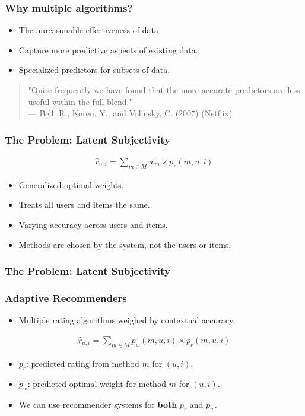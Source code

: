 \documentclass[screen]{beamer}
\begin{document}
\begin{frame}
  \frametitle{Why multiple algorithms?}
  \begin{itemize}
    \item The unreasonable effectiveness of data
    \item Capture more predictive aspects of existing data.
    \item Specialized predictors for subsets of data.
  \end{itemize}
  \vspace{2em}
  \begin{quote}
    "Quite frequently we have found that the more accurate predictors are less useful within the full blend."\\
    --- Bell, R., Koren, Y., and Volinsky, C. (2007) (Netflix)
  \end{quote}  
\end{frame}

\begin{frame}
  \frametitle{The Problem: Latent Subjectivity}
  \begin{eqnarray}
    \hat{r}_{u,i} = \sum_{m \in M} w_{m} \times p_{r}(m,u,i)
  \end{eqnarray}
  \begin{itemize}
    \item Generalized optimal weights.
    \item Treats all users and items the same.
    \item Varying accuracy across users and items.
    \item Methods are chosen by the system, not the users or items.
  \end{itemize}
\end{frame}

\begin{frame}
  \frametitle{The Problem: Latent Subjectivity}
  \huge
  \linespread{2}{
    Systems that insist on being adaptive in a certain way
    are not really adaptive at all.
  }
\end{frame}

\begin{frame}
  \frametitle{Adaptive Recommenders}
  \begin{itemize}
    \item Multiple rating algorithms weighed by contextual accuracy.
  \end{itemize}
  \begin{eqnarray}
    \hat{r}_{u,i} = \sum_{m \in M} p_{w}(m,u,i) \times p_{r}(m,u,i)
  \end{eqnarray}
  \begin{itemize}
    \item $p_r$: predicted rating from method $m$ for $(u,i)$.
    \item $p_w$: predicted optimal weight for method $m$ for $(u,i)$.
    \item We can use recommender systems for \textbf{both} $p_r$ and $p_w$.
  \end{itemize}
\end{frame}
\end{document}
